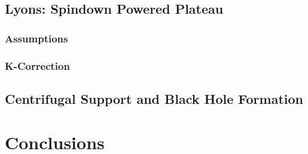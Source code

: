 \documentclass{article}
\begin{document}
\subsection{Lyons: Spindown Powered Plateau}

\subsubsection{Assumptions}

\subsubsection{K-Correction}

\subsection{Centrifugal Support and Black Hole Formation}

\section{Conclusions}



\end{document}
